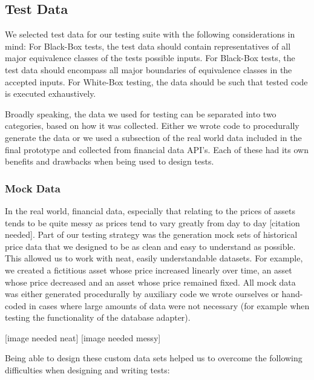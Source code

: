 \documentclass[main.tex]{subfiles}
\begin{document}
\subsection{Test Data}

We selected test data for our testing suite with the following considerations in mind:
For Black-Box tests, the test data should contain representatives of all major equivalence classes of the tests possible inputs.
For Black-Box tests, the test data should encompass all major boundaries of equivalence classes in the accepted inputs.
For White-Box testing, the data should be such that tested code is executed exhaustively.

Broadly speaking, the data we used for testing can be separated into two categories, based on how it was collected. Either we wrote code to procedurally generate the data or we used a subsection of the real world data included in the final prototype and collected from financial data API’s. Each of these had its own benefits and drawbacks when being used to design tests.

\subsubsection{Mock Data}
In the real world, financial data, especially that relating to the prices of assets tends to be quite messy as prices tend to vary greatly from day to day [citation needed]. Part of our testing strategy was the generation mock sets of historical price data that we designed to be as clean and easy to understand as possible. This allowed us to work with neat, easily understandable datasets. For example, we created a fictitious asset whose price increased linearly over time, an asset whose price decreased and an asset whose price remained fixed. All mock data was either generated procedurally by auxiliary code we wrote ourselves or hand-coded in cases where large amounts of data were not necessary (for example when testing the functionality of the database adapter). 

[image needed neat] [image needed messy]

Being able to design these custom data sets helped us to overcome the following difficulties when designing and writing tests:
\end{document}
